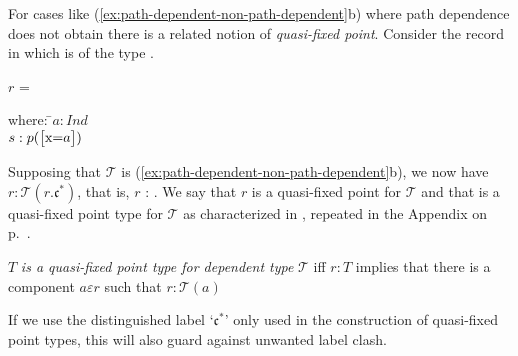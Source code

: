 \begin{shaded}
For cases like (\ref{ex:path-dependent-non-path-dependent}b) where
path dependence does not obtain there is a related notion of
\textit{quasi-fixed point}.  Consider the record in  which
is of the type .
\begin{ex} 
\begin{subex} 
 
\item $r$ = 

  \begin{tabbing}
    where: \=$a:\textit{Ind}$\\
    \>$s:p(\text{\smallrecord{
        \field{x}{$a$}}})$
  \end{tabbing}
  
 
\item {}
 
\end{subex} 
   
\end{ex} 
Supposing that $\mathcal{T}$ is
(\ref{ex:path-dependent-non-path-dependent}b), we now have
$r:\mathcal{T}(r.\mathfrak{c}^*)$, that is, $r$ :
.  We
say that $r$ is a quasi-fixed point for $\mathcal{T}$ and that
 is a quasi-fixed point type for $\mathcal{T}$ as
characterized in \nexteg{}, repeated in the
Appendix on p.~\pageref{pg:fixedpointtype}.
\begin{ex} 
$T$ \textit{is a quasi-fixed point type for dependent type}
$\mathcal{T}$ iff $r:T$ implies that there is a component
$a\varepsilon r$ such that $r:\mathcal{T}(a)$ 
\end{ex} 
If we use the distinguished label `$\mathfrak{c}^*$' only used in the
construction of quasi-fixed point types, this will also guard against
unwanted label clash. 


\end{shaded}
